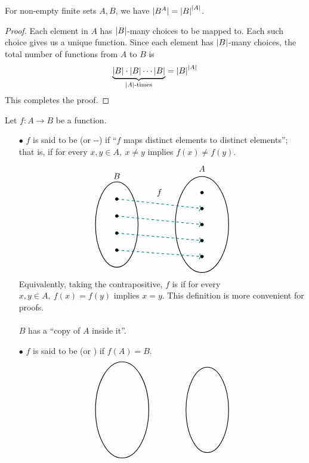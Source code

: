 \vspace*{1em}

\begin{lemma}
For non-empty finite sets $A,B$, we have $|B^A| = \left\lvert B\right\rvert^{\left\lvert A\right\rvert}$.
\end{lemma}
\begin{proof}
Each element in $A$ has $\left\lvert B\right\rvert$-many choices to be mapped to. Each such choice gives us a unique function. Since each element has $\left\lvert B\right\rvert$-many choices, the total number of functions from $A$ to $B$ is
\[\underbrace{\left\lvert B\right\rvert \cdot \left\lvert B\right\rvert \cdots \left\lvert B\right\rvert}_{\left\lvert A\right\rvert \text{-times}} = \left\lvert B\right\rvert^{\left\lvert A\right\rvert}\]
This completes the proof. 
\end{proof}

\vspace*{1em}

\begin{definition}
Let $f:A \to B$  be a function.
\begin{itemize}
\item[$\bullet$] $f$ is said to be  (or {\color{blue}--}) if ``$f$ maps distinct elements to distinct elements''; that is, if for every $x,y \in A,\ x \neq y$ implies $f(x) \neq f(y)$.
\[\begin{tikzpicture}[scale=0.9]
\draw[thick] (0,0) ellipse (1cm and 2cm);
\draw[thick] (4,0) ellipse (1.25cm and 2.25cm);

\draw[->,thick,dashed,teal] (0,1.2) -- (4,0.75) node[midway,above,yshift=5pt] {\color{black}$f$};
\draw[->,thick,dashed,teal] (0,0.4) -- (4,0);
\draw[->,thick,dashed,teal] (0,-0.4) -- (4,-0.75);
\draw[->,thick,dashed,teal] (0,-1.2) -- (4,-1.5);

\filldraw (0,1.2) circle (2pt);
\filldraw (0,0.4) circle (2pt);
\filldraw (0,-0.4) circle (2pt);
\filldraw (0,-1.2) circle (2pt);

\filldraw (4,1.5) circle (2pt);
\filldraw (4,0.75) circle (2pt);
\filldraw (4,0) circle (2pt);
\filldraw (4,-0.75) circle (2pt);
\filldraw (4,-1.5) circle (2pt);

\node[above] at (4,2.35) {$A$};
\node[above] at (0,2) {$B$};
\end{tikzpicture}\]
Equivalently, taking the contrapositive, $f$ is  if for every $x,y \in A,\ f(x) = f(y)$ implies $x = y$. This definition is more convenient for proofs.\\
\\
$B$ has a ``copy of $A$ inside it''.

\item[$\bullet$] $f$ is said to be  (or ) if $f(A) = B$.
\[\begin{tikzpicture}[scale=0.9]
\draw[thick] (4,0) ellipse (1cm and 2cm);
\draw[thick] (0,0) ellipse (1.25cm and 2.25cm);


\end{tikzpicture}\]
\end{itemize}
\end{definition}
